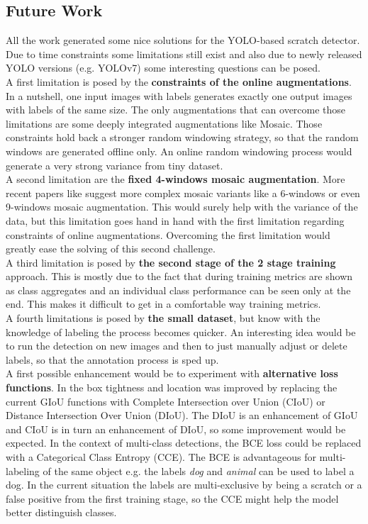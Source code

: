 \subsection{Future Work}
All the work generated some nice solutions for the YOLO-based scratch detector. Due to time constraints some limitations still exist and also due to newly released YOLO versions (e.g. YOLOv7) some interesting questions can be posed. \\
A first limitation is posed by the \textbf{constraints of the online augmentations}. In a nutshell, one input images with labels generates exactly one output images with labels of the same size. The only augmentations that can overcome those limitations are some deeply integrated augmentations like Mosaic. Those constraints hold back a stronger random windowing strategy, so that the random windows are generated offline only. An online random windowing process would generate a very strong variance from tiny dataset. \\
A second limitation are the \textbf{fixed 4-windows mosaic augmentation}. More recent papers like \cite{yolo_smoke_paper, improved_mosaic_paper} suggest more complex mosaic variants like a 6-windows or even 9-windows mosaic augmentation. This would surely help with the variance of the data, but this limitation goes hand in hand with the first limitation regarding constraints of online augmentations. Overcoming the first limitation would greatly ease the solving of this second challenge. \\
A third limitation is posed by \textbf{the second stage of the 2 stage training} approach. This is mostly due to the fact that during training metrics are shown as class aggregates and an individual class performance can be seen only at the end. This makes it difficult to get in a comfortable way training metrics. \\
A fourth limitations is posed by \textbf{the small dataset}, but know with the knowledge of labeling the process becomes quicker. An interesting idea would be to run the detection on new images and then to just manually adjust or delete labels, so that the annotation process is sped up. \\
A first possible enhancement would be to experiment with \textbf{alternative loss functions}. In \cite{yolo_smoke_paper} the box tightness and location was improved by replacing the current GIoU functions with Complete Intersection over Union (CIoU) or Distance Intersection Over Union (DIoU). The DIoU is an enhancement of GIoU and CIoU is in turn an enhancement of DIoU, so some improvement would be expected. In the context of multi-class detections, the BCE loss could be replaced with a Categorical Class Entropy (CCE). The BCE is advantageous for multi-labeling of the same object e.g. the labels \textit{dog} and \textit{animal} can be used to label a dog. In the current situation the labels are multi-exclusive by being a scratch or a false positive from the first training stage, so the CCE might help the model better distinguish classes. \\

